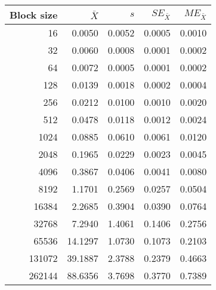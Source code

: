 \begin{tabular}{rrrrr}\toprule
{\small Block size} & $\bar{X}$ & $s$ & $SE_{\bar{X}}$ & $ME_{\bar{X}}$ \\\midrule
16 & 0.0050 & 0.0052 & 0.0005 & 0.0010\\
32 & 0.0060 & 0.0008 & 0.0001 & 0.0002\\
64 & 0.0072 & 0.0005 & 0.0001 & 0.0002\\
128 & 0.0139 & 0.0018 & 0.0002 & 0.0004\\
256 & 0.0212 & 0.0100 & 0.0010 & 0.0020\\
512 & 0.0478 & 0.0118 & 0.0012 & 0.0024\\
1024 & 0.0885 & 0.0610 & 0.0061 & 0.0120\\
2048 & 0.1965 & 0.0229 & 0.0023 & 0.0045\\
4096 & 0.3867 & 0.0406 & 0.0041 & 0.0080\\
8192 & 1.1701 & 0.2569 & 0.0257 & 0.0504\\
16384 & 2.2685 & 0.3904 & 0.0390 & 0.0764\\
32768 & 7.2940 & 1.4061 & 0.1406 & 0.2756\\
65536 & 14.1297 & 1.0730 & 0.1073 & 0.2103\\
131072 & 39.1887 & 2.3788 & 0.2379 & 0.4663\\
262144 & 88.6356 & 3.7698 & 0.3770 & 0.7389\\
\bottomrule
\end{tabular}
